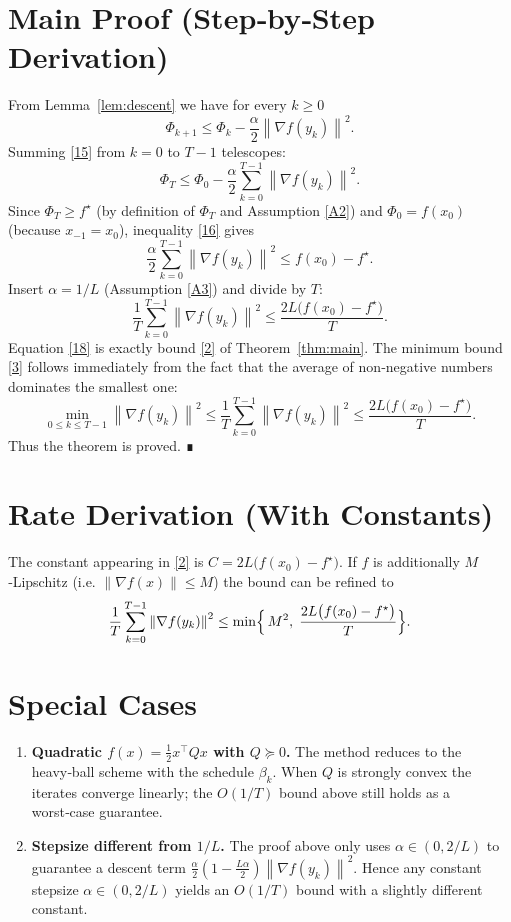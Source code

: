 \documentclass{article}
\newcommand{\grad}{\nabla}
\newcommand{\norm}[1]{\left\|#1\right\|}
\begin{document}
\section*{Main Proof (Step‑by‑Step Derivation)}
From Lemma~\ref{lem:descent} we have for every $k\ge0$
\[
\Phi_{k+1}\le\Phi_k-\frac{\alpha}{2}\norm{\grad f(y_k)}^{2}.
\tag{15}
\]
Summing \eqref{15} from $k=0$ to $T-1$ telescopes:
\[
\Phi_T\le\Phi_0-\frac{\alpha}{2}\sum_{k=0}^{T-1}\norm{\grad f(y_k)}^{2}.
\tag{16}
\]
Since $\Phi_T\ge f^\star$ (by definition of $\Phi_T$ and Assumption \ref{A2}) and $\Phi_0=f(x_0)$ (because $x_{-1}=x_0$), inequality \eqref{16} gives
\[
\frac{\alpha}{2}\sum_{k=0}^{T-1}\norm{\grad f(y_k)}^{2}
\le f(x_0)-f^\star .
\tag{17}
\]
Insert $\alpha=1/L$ (Assumption \ref{A3}) and divide by $T$:
\[
\frac{1}{T}\sum_{k=0}^{T-1}\norm{\grad f(y_k)}^{2}
\le \frac{2L\bigl(f(x_0)-f^\star\bigr)}{T}.
\tag{18}
\]
Equation \eqref{18} is exactly bound \eqref{2} of Theorem~\ref{thm:main}.  The minimum bound \eqref{3} follows immediately from the fact that the average of non‑negative numbers dominates the smallest one:
\[
\min_{0\le k\le T-1}\norm{\grad f(y_k)}^{2}
\le\frac{1}{T}\sum_{k=0}^{T-1}\norm{\grad f(y_k)}^{2}
\le\frac{2L\bigl(f(x_0)-f^\star\bigr)}{T}.
\tag{19}
\]
Thus the theorem is proved. ∎

\section*{Rate Derivation (With Constants)}
The constant appearing in \eqref{2} is $C=2L\bigl(f(x_0)-f^\star\bigr)$.  
If $f$ is additionally $M$‑Lipschitz (i.e. $\norm{\grad f(x)}\le M$) the bound can be refined to
\[
\frac{1}{T}\sum_{k=0}^{T-1}\norm{\grad f(y_k)}^{2}
\le \min\Bigl\{\,M^{2},\;\frac{2L\bigl(f(x_0)-f^\star\bigr)}{T}\Bigr\}.
\]

\section*{Special Cases}
\begin{enumerate}[label={\bf S\arabic*}.]
\item \textbf{Quadratic $f(x)=\frac{1}{2}x^{\!\top}Qx$ with $Q\succeq0$.}  
   The method reduces to the heavy‑ball scheme with the schedule $\beta_k$.
   When $Q$ is strongly convex the iterates converge linearly; the $O(1/T)$ bound above still holds as a worst‑case guarantee.
\item \textbf{Stepsize different from $1/L$.}  
   The proof above only uses $\alpha\in(0,2/L)$ to guarantee a descent term
   $\frac{\alpha}{2}(1-\frac{L\alpha}{2})\norm{\grad f(y_k)}^{2}$.
   Hence any constant stepsize $\alpha\in(0,2/L)$ yields an $O(1/T)$ bound with a slightly different constant.
\end{enumerate}
\end{document}

